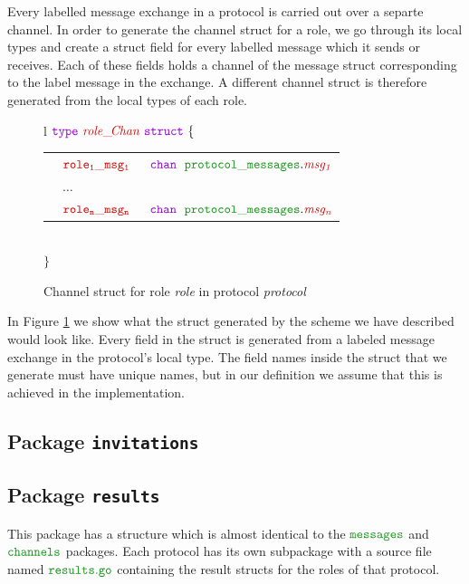 \documentclass[12pt,twoside]{report}
\begin{document}
Every labelled message exchange in a protocol is carried out over a separte channel. In order to generate the channel struct for a role, we go through its local types and create a struct field for every labelled message which it sends or receives. Each of these fields holds a channel of the message struct corresponding to the label message in the exchange. A different channel struct is therefore generated from the local types of each role.\\

\begin{figure}[!h]
    \begin{center}
        \begin{tabular}{l}
            $\gotype\ \structname{role\_\!Chan}\ \gostruct\ \{$\\[3pt]
            \begin{tabular}{lll}
                \indent & $\structfield{role_1\_msg_1}$\ &$\gochan\ \;\pkgstructaccess{protocol\_messages}{msg_1}$\\
                \indent & $\dots$ & \\
                \indent & $\structfield{role_n\_msg_n}$\ &$\gochan\ \;\pkgstructaccess{protocol\_messages}{msg_n}$
            \end{tabular}\\
            $\}$
        \end{tabular}
    \end{center}
    \caption{Channel struct for role \textit{role} in protocol \textit{protocol}}
    \label{channel-struct-gen}
\end{figure}

In Figure \ref{channel-struct-gen} we show what the struct generated by the scheme we have described would look like. Every field in the struct is generated from a labeled message exchange in the protocol's local type. The field names inside the struct that we generate must have unique names, but in our definition we assume that this is achieved in the implementation.

\subsection{Package \texttt{invitations}}

\subsection{Package \texttt{results}}
This package has a structure which is almost identical to the $\pkgname{messages}$ and $\pkgname{channels}$ packages. Each protocol has its own subpackage with a source file named $\filename{results}$ containing the result structs for the roles of that protocol.\\
\end{document}
